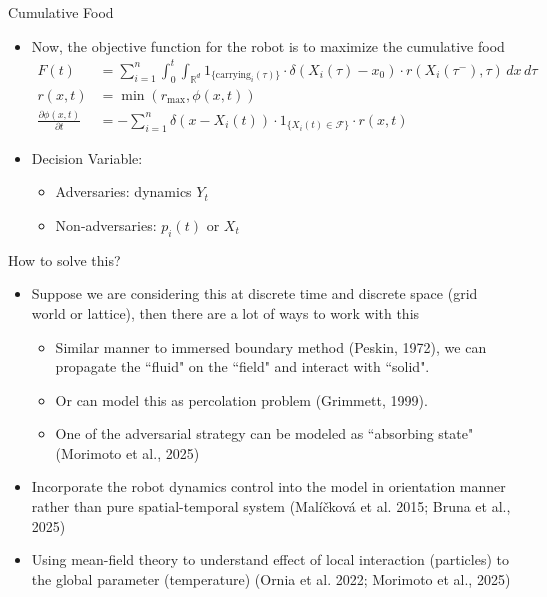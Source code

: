 \documentclass[10pt]{beamer}
\begin{document}
  \begin{frame}{Cumulative Food}
    \begin{itemize}
      \item Now, the objective function for the robot is to maximize the cumulative food
      \begin{align*}
F(t) &= \sum_{i=1}^n \int_0^t \int_{\mathbb{R}^d} 1_{\{\text{carrying}_i(\tau)\}} \cdot \delta(X_i(\tau) - x_0) \cdot r(X_i(\tau^-), \tau) \, dx \, d\tau \\
r(x,t) &= \min\left(r_{\max}, \phi(x,t)\right) \\
\frac{\partial \phi(x,t)}{\partial t} &= - \sum_{i=1}^n \delta(x - X_i(t)) \cdot 1_{\{X_i(t) \in \mathcal{F}\}} \cdot r(x,t)
\end{align*}
\item Decision Variable: 
\begin{itemize}
    \item Adversaries: dynamics $Y_t$
    \item Non-adversaries: $p_i(t)$ or $X_t$
\end{itemize}
    \end{itemize}
  \end{frame}
  \begin{frame}{How to solve this?}
      \begin{itemize}
          \item Suppose we are considering this at discrete time and discrete space (grid world or lattice), then there are a lot of ways to work with this
          \begin{itemize}
              \item Similar manner to immersed boundary method (Peskin, 1972), we can propagate the ``fluid" on the ``field" and interact with ``solid".
              \item Or can model this as percolation problem (Grimmett, 1999).
              \item One of the adversarial strategy can be modeled as ``absorbing state" (Morimoto et al., 2025)
          \end{itemize}
          \item Incorporate the robot dynamics control into the model in orientation manner rather than pure spatial-temporal system (Malíčková et al. 2015; Bruna et al., 2025)
          \item Using mean-field theory to understand effect of local interaction (particles) to the global parameter (temperature) (Ornia et al. 2022; Morimoto et al., 2025)
      \end{itemize}
  \end{frame}
  
\end{document}
